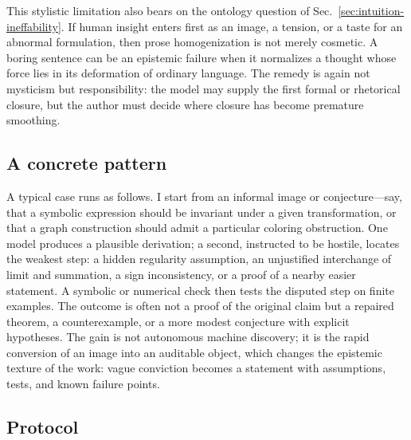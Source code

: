 \documentclass[
  aps,
  reprint,
  superscriptaddress,
  floatfix,
  nofootinbib,
  longbibliography
]{revtex4-2}
\begin{document}
This stylistic limitation also bears on the ontology question of
Sec.~\ref{sec:intuition-ineffability}. If human insight enters first as an image,
a tension, or a taste for an abnormal formulation, then prose homogenization is
not merely cosmetic. A boring sentence can be an epistemic failure when it
normalizes a thought whose force lies in its deformation of ordinary language.
The remedy is again not mysticism but responsibility: the model may supply the
first formal or rhetorical closure, but the author must decide where closure has
become premature smoothing.

\subsection{A concrete pattern}

A typical case runs as follows. I start from an informal image or
conjecture---say, that a symbolic expression should be invariant under a given
transformation, or that a graph construction should admit a particular coloring
obstruction. One model produces a plausible derivation; a second, instructed to
be hostile, locates the weakest step: a hidden regularity assumption, an
unjustified interchange of limit and summation, a sign inconsistency, or a proof
of a nearby easier statement. A symbolic or numerical check then tests the
disputed step on finite examples. The outcome is often not a proof of the
original claim but a repaired theorem, a counterexample, or a more modest
conjecture with explicit hypotheses. The gain is not autonomous machine
discovery; it is the rapid conversion of an image into an auditable object, which
changes the epistemic texture of the work: vague conviction becomes a statement
with assumptions, tests, and known failure points.

\subsection{Protocol}
\end{document}
